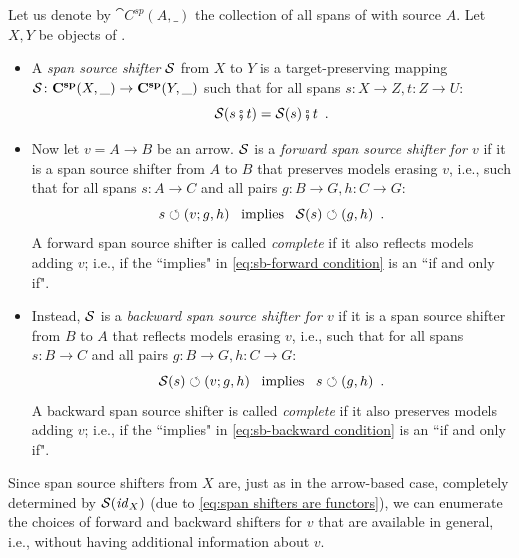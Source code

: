 \begin{definition}\label{def:sb-shifters}
Let us denote by $\cat{C^{sp}}(A,\_)$ the collection of all spans of  with source $A$. Let $X,Y$ be objects of . 
\begin{itemize}[topsep=\smallskipamount]
\item A \emph{span source shifter} $\mathcal{S}$ from $X$ to $Y$ is a target-preserving mapping $\mathcal{S} \colon \mathbf{C^{sp}}(X,\_) \rightarrow \mathbf{C^{sp}}(Y, \_)$
such that for all spans $s:X\to Z,t:Z\to U$:
%
\begin{equation}\label{eq:span shifters are functors}
\mathcal{S}(s \fatsemi t) = \mathcal{S}(s)\fatsemi t \enspace.
\end{equation}
%
\item Now let $v=A\to B$ be an arrow. $\mathcal{S}$ is a \emph{forward span source shifter for $v$} if it is a span source shifter from $A$ to $B$ that preserves models erasing $v$, i.e., such that for all spans $s:A\to C$ and all pairs $g:B\to G,h:C \to G$:
%
\begin{equation}\label{eq:sb-forward condition}
s\circlearrowleft (v;g,h) \enspace\text{ implies }\enspace \mathcal{S}(s) \circlearrowleft (g,h) \enspace.
\end{equation}
%
A forward span source shifter is called \emph{complete} if it also reflects models adding $v$; i.e., if the ``implies" in \eqref{eq:sb-forward condition} is an ``if and only if".

\item Instead, $\mathcal{S}$ is a \emph{backward span source shifter for $v$} if it is a span source shifter from $B$ to $A$ that reflects models erasing $v$, i.e., such that for all spans $s:B\to C$ and all pairs $g:B\to G,h:C\to G$:
%
\begin{equation}\label{eq:sb-backward condition}
\mathcal{S}(s) \circlearrowleft (v;g,h) \enspace\text{ implies }\enspace s\circlearrowleft (g,h) \enspace.
\end{equation}
%
A backward span source shifter is called \emph{complete} if it also preserves models adding $v$; i.e., if the ``implies" in \eqref{eq:sb-backward condition} is an ``if and only if".
\end{itemize}
\end{definition}
%
Since span source shifters from $X$ are, just as in the arrow-based case, completely determined by $\mathcal{S}(\mathit{id}_X)$ (due to \eqref{eq:span shifters are functors}), we can enumerate the choices of forward and backward shifters for $v$ that are available in general, i.e., without having additional information about $v$.
